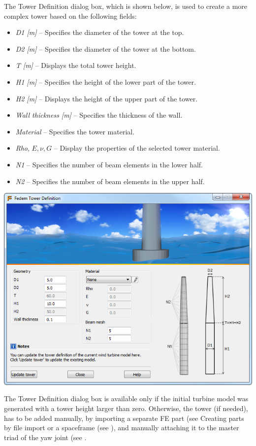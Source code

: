 The Tower Definition dialog box, which is shown below,
is used to create a more complex tower based on the following fields:

\begin{itemize}
\item{\sl D1 [m]} --
  Specifies the diameter of the tower at the top.
\item{\sl D2 [m]} --
  Specifies the diameter of the tower at the bottom.
\item{\sl T [m]} --
  Displays the total tower height.
\item{\sl H1 [m]} --
  Specifies the height of the lower part of the tower.
\item{\sl H2 [m]} --
  Displays the height of the upper part of the tower.
\item{\sl Wall thickness [m]} --
  Specifies the thickness of the wall.
\item{\sl Material} --
  Specifies the tower material.
\item{\sl Rho}, $E, \nu, G$ --
  Display the properties of the selected tower material.
\item{\sl N1} --
  Specifies the number of beam elements in the lower half.
\item{\sl N2} --
  Specifies the number of beam elements in the upper half.
\end{itemize}

\noindent\includegraphics[width=\textwidth]{Figures/3b-TowerDefinition}

The Tower Definition dialog box is available only if the initial turbine
model was generated with a tower height larger than zero. Otherwise, the
tower (if needed), has to be added manually, by importing a separate FE
part (see 
                     {Creating parts by file import}
or a spaceframe (see
),
and manually attaching it to the master triad of the yaw joint (see
.


